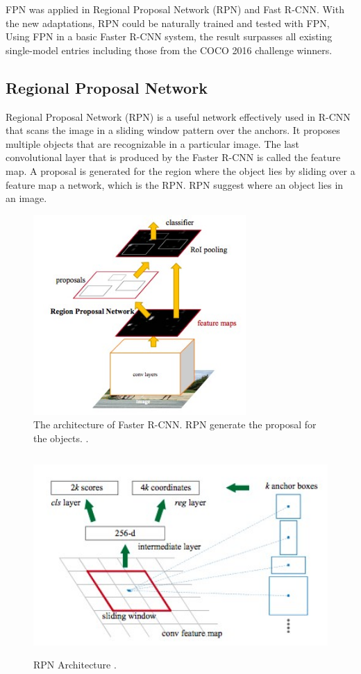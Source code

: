FPN was applied in Regional Proposal Network (RPN) and Fast R-CNN. With the new adaptations, RPN could be naturally trained and tested with FPN, Using FPN in a basic Faster R-CNN system, the result surpasses all existing single-model entries including those from the COCO 2016 challenge winners.

\subsection{Regional Proposal Network}
Regional Proposal Network (RPN) is a useful network effectively used in R-CNN that scans the image in a sliding window pattern over the anchors.  It proposes multiple objects that are recognizable in a particular image. The last convolutional layer that is produced by the Faster R-CNN is called the feature map. A proposal is generated for the region where the object lies by sliding over a feature map a network, which is the RPN. RPN suggest where an object lies in an image.
\begin{figure}[H]
\centering
  \includegraphics[height=3in]{images/rcnn-rpn.jpg}
   \caption{The architecture of Faster R-CNN. RPN generate the proposal for the objects. \cite{J}.}
\end{figure}

\begin{figure}[H]
\centering
  \includegraphics[height=3in]{images/rpn-arch.jpg}
   \caption{RPN Architecture \cite{J}.}
\end{figure}

